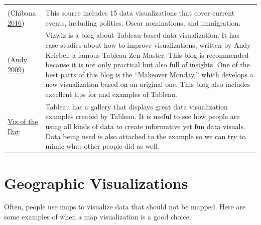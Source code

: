 \documentclass[]{book}
\begin{document}
\begin{longtable}[]{@{}ll@{}}
\begin{minipage}[t]{0.80\columnwidth}
\end{minipage}\tabularnewline
\begin{minipage}[t]{0.14\columnwidth}\raggedright
(Chibana \protect\hyperlink{ref-int_viz_current}{2016})\strut
\end{minipage} & \begin{minipage}[t]{0.80\columnwidth}\raggedright
This source includes 15 data visualizations that cover current events, including politics, Oscar nominations, and immigration.\strut
\end{minipage}\tabularnewline
\begin{minipage}[t]{0.14\columnwidth}\raggedright
(Andy \protect\hyperlink{ref-vizwiz}{2009})\strut
\end{minipage} & \begin{minipage}[t]{0.80\columnwidth}\raggedright
Vizwiz is a blog about Tableau-based data visualization. It has case studies about how to improve visualizations, written by Andy Kriebel, a famous Tableau Zen Master. This blog is recommended because it is not only practical but also full of insights. One of the best parts of this blog is the ``Makeover Monday,'' which develops a new visualization based on an original one. This blog also includes excellent tips for and examples of Tableau.\strut
\end{minipage}\tabularnewline
\begin{minipage}[t]{0.14\columnwidth}\raggedright
\href{https://public.tableau.com/en-us/s/gallery}{Viz of the Day}\strut
\end{minipage} & \begin{minipage}[t]{0.80\columnwidth}\raggedright
Tableau has a gallery that displays great data visualization examples created by Tableau. It is useful to see how people are using all kinds of data to create informative yet fun data visuals. Data being used is also attached to the example so we can try to mimic what other people did as well.\strut
\end{minipage}\tabularnewline
\bottomrule
\end{longtable}

\hypertarget{geographic-visualizations}{%
\section{Geographic Visualizations}\label{geographic-visualizations}}

Often, people use maps to visualize data that should not be mapped. Here are some examples of when a map visualization is a good choice.
\end{document}

